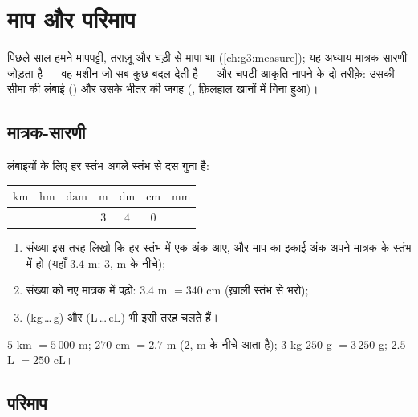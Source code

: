 \chapter{माप और परिमाप}\label{ch:g4:measure}

पिछले साल हमने मापपट्टी, तराज़ू और घड़ी से मापा था
(\cref{ch:g3:measure}); यह अध्याय मात्रक-सारणी जोड़ता है ---
वह मशीन जो सब कुछ बदल देती है --- और चपटी आकृति नापने के दो
तरीक़े: उसकी सीमा की लंबाई () और उसके भीतर की जगह
(, फ़िलहाल खानों में गिना हुआ)।

\section{मात्रक-सारणी}

\begin{method}[सारणी से मात्रक बदलना]\label{met:g4:measure:table}
लंबाइयों के लिए हर स्तंभ अगले स्तंभ से दस गुना है:
\begin{center}
\renewcommand{\arraystretch}{1.3}
\begin{tabular}{c|c|c|c|c|c|c}
$\mathrm{km}$ & $\mathrm{hm}$ & $\mathrm{dam}$ & $\mathrm{m}$ & $\mathrm{dm}$ & $\mathrm{cm}$ & $\mathrm{mm}$ \\
\hline
 & & & $3$ & $4$ & $0$ & \\
\end{tabular}
\end{center}
\begin{enumerate}
  \item संख्या इस तरह लिखो कि हर स्तंभ में एक अंक आए, और माप का
        इकाई अंक अपने मात्रक के स्तंभ में हो (यहाँ $3.4$ m:
        $3$, m के नीचे);
  \item संख्या को नए मात्रक में पढ़ो: $3.4$ m $= 340$ cm
        (ख़ाली स्तंभ  से भरो);
  \item {} (kg\,\dots\,g) और  (L\,\dots\,cL) भी
        इसी तरह चलते हैं।
\end{enumerate}
\end{method}

\begin{example}\label{ex:g4:measure:convert}
$5$ km $= 5\,000$ m; \quad $270$ cm $= 2.7$ m ($2$, m के नीचे
आता है); \quad $3$ kg $250$ g $= 3\,250$ g; \quad
$2.5$ L $= 250$ cL।
\end{example}

\section{परिमाप}

